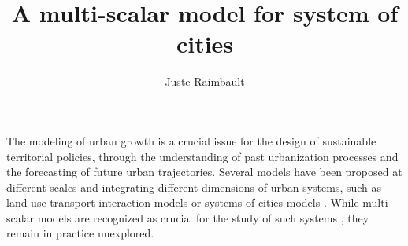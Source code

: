 \documentclass[11pt, a4paper]{article}
\begin{document}
\title{\vspace{-3.0cm}\large\textbf{A multi-scalar model for system of cities}}

\author[1,2,3]{\footnotesize Juste Raimbault}
\date{\vspace{-5ex}}

\maketitle
\thispagestyle{empty}

\noindent



The modeling of urban growth is a crucial issue for the design of sustainable territorial policies, through the understanding of past urbanization processes and the forecasting of future urban trajectories. Several models have been proposed at different scales and integrating different dimensions of urban systems, such as land-use transport interaction models \cite{wegener2004land} or systems of cities models \cite{pumain2017urban}. While multi-scalar models are recognized as crucial for the study of such systems \cite{Rozenblat2018}, they remain in practice unexplored.
\end{document}
